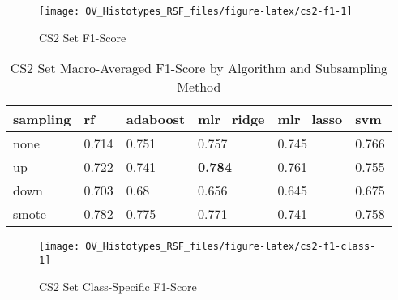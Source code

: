 \documentclass[
]{report}
\begin{document}
\begin{figure}[H]

{\centering \texttt{[image: OV\_Histotypes\_RSF\_files/figure-latex/cs2-f1-1]} 

}

\caption{CS2 Set F1-Score}\label{fig:cs2-f1}
\end{figure}

\begin{table}

\caption{\label{tab:cs2-f1-table}CS2 Set Macro-Averaged F1-Score by Algorithm and Subsampling Method}
\centering
\begin{tabular}[t]{l|l|l|l|l|l}
\hline
sampling & rf & adaboost & mlr\_ridge & mlr\_lasso & svm\\
\hline
none & 0.714 & 0.751 & 0.757 & 0.745 & 0.766\\
\hline
up & 0.722 & 0.741 & \textbf{0.784} & 0.761 & 0.755\\
\hline
down & 0.703 & 0.68 & 0.656 & 0.645 & 0.675\\
\hline
smote & 0.782 & 0.775 & 0.771 & 0.741 & 0.758\\
\hline
\end{tabular}
\end{table}

\begin{figure}[H]

{\centering \texttt{[image: OV\_Histotypes\_RSF\_files/figure-latex/cs2-f1-class-1]} 

}

\caption{CS2 Set Class-Specific F1-Score}\label{fig:cs2-f1-class}
\end{figure}
\end{document}
